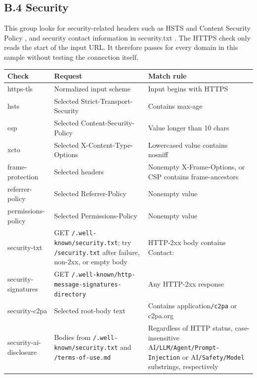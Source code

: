 \documentclass{article}
\begin{document}
\subsection*{B.4 Security}

This group looks for security-related headers such as HSTS \cite{ref15} and Content Security Policy \cite{ref16}, and security contact information in security.txt \cite{ref17}. The HTTPS check only reads the start of the input URL. It therefore passes for every domain in this sample without testing the connection itself.

\begingroup
\footnotesize
\setlength{\tabcolsep}{3pt}
\setlength{\LTleft}{0pt}
\setlength{\LTright}{0pt plus 1fill}
\begin{longtable}{>{\raggedright\arraybackslash}p{}>{\raggedright\arraybackslash}p{}>{\raggedright\arraybackslash}p{}}
\toprule
\textbf{Check} & \textbf{Request} & \textbf{Match rule} \\
\midrule
\endhead
https-tls & Normalized input scheme & Input begins with HTTPS \\
hsts & Selected Strict-Transport-Security & Contains max-age \\
csp & Selected Content-Security-Policy & Value longer than 10 chars \\
xcto & Selected X-Content-Type-Options & Lowercased value contains nosniff \\
frame-protection & Selected headers & Nonempty X-Frame-Options, or CSP contains frame-ancestors \\
referrer-policy & Selected Referrer-Policy & Nonempty value \\
permissions-policy & Selected Permissions-Policy & Nonempty value \\
security-txt & GET \nolinkurl{/.well-known/security.txt}; try \nolinkurl{/security.txt} after failure, non-2xx, or empty body & HTTP-2xx body contains Contact: \\
security-signatures & GET \nolinkurl{/.well-known/http-message-signatures-directory} & Any HTTP-2xx response \\
security-c2pa & Selected root-body text & Contains application\nolinkurl{/c2pa} or c2pa.org \\
security-ai-disclosure & Bodies from \nolinkurl{/.well-known/security.txt} and \nolinkurl{/terms-of-use.md} & Regardless of HTTP status, case-insensitive AI\nolinkurl{/LLM/Agent/Prompt-Injection} or AI\nolinkurl{/Safety/Model} substrings, respectively \\
\bottomrule
\end{longtable}
\endgroup
\end{document}
